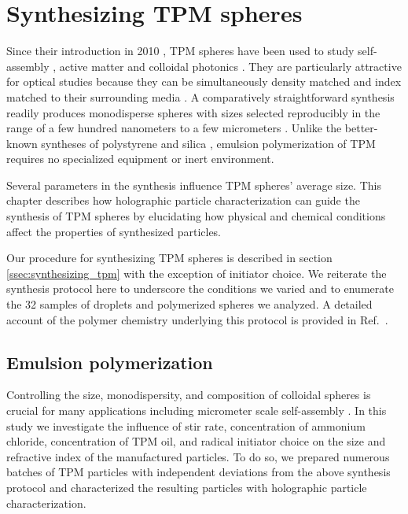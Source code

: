 \section{Synthesizing TPM spheres}

Since their introduction in 2010 \cite{}, TPM spheres have been used to
study self-assembly \cite{}, active matter \cite{}  and colloidal photonics \cite{}.
They are particularly attractive for optical studies because they can be
simultaneously density matched and index matched to their surrounding
media \cite{}.
A comparatively straightforward synthesis readily produces monodisperse spheres
with sizes selected reproducibly in the range of a few hundred nanometers to a
few micrometers \cite{liu16}.
Unlike the better-known syntheses of polystyrene \cite{goodwin1974} and
silica \cite{stober68},
emulsion polymerization of TPM requires no specialized equipment or
inert environment.

Several parameters in the synthesis influence TPM spheres' average size.
This chapter describes how holographic particle
characterization can guide the synthesis of TPM spheres by elucidating how
physical and chemical conditions affect the properties of synthesized particles.

Our procedure for synthesizing TPM spheres is described in section
\ref{ssec:synthesizing_tpm} with the
exception of initiator choice. We reiterate the synthesis protocol
here to underscore the conditions we varied and to enumerate the
\num{32} samples of droplets and polymerized spheres we analyzed.
A detailed account of the polymer chemistry underlying this
protocol is provided in Ref.~\cite{vanderwel17}.

\subsection{Emulsion polymerization}
\label{ssec:polymerization}

Controlling the size, monodispersity, and composition of colloidal spheres is crucial
for many applications including micrometer scale self-assembly \cite{pusey87,sacanna11}.
In this study we investigate the influence of stir rate, concentration of ammonium chloride,
concentration of TPM oil, and radical initiator choice on the size and refractive index
of the manufactured particles. To do so, we prepared numerous batches of TPM particles
with independent deviations from the above synthesis protocol and
characterized the resulting particles with holographic particle characterization.

